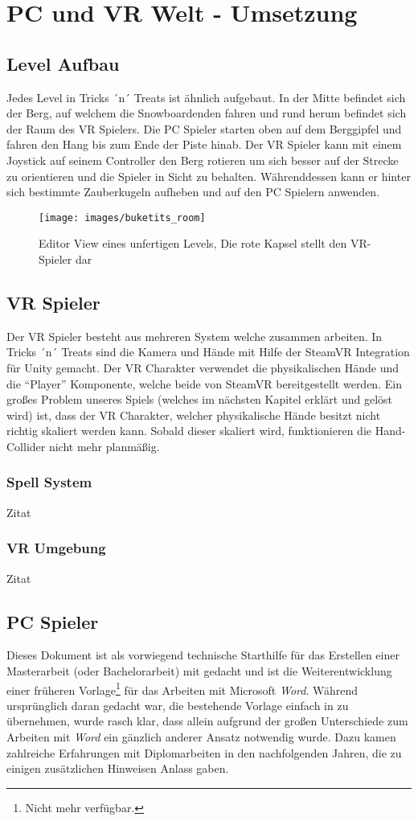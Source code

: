 \chapter{PC und VR Welt - Umsetzung}
\section{Level Aufbau}
Jedes Level in Tricks ´n´ Treats ist ähnlich aufgebaut. 
In der Mitte befindet sich der Berg, auf welchem die Snowboardenden fahren und rund herum befindet sich der Raum des VR Spielers. Die PC Spieler starten oben auf dem Berggipfel und fahren den Hang bis zum Ende der Piste hinab. Der VR Spieler kann mit einem Joystick auf seinem Controller den Berg rotieren um sich besser auf der Strecke zu orientieren und die Spieler in Sicht zu behalten. Währenddessen kann er hinter sich bestimmte Zauberkugeln aufheben und auf den PC Spielern anwenden.

\begin{figure}[h]
	\centering
	\texttt{[image: images/buketits\_room]}
	\caption{Editor View eines unfertigen Levels, Die rote Kapsel stellt den VR-Spieler dar}
\end{figure}

\section{VR Spieler}
Der VR Spieler besteht aus mehreren System welche zusammen arbeiten. In Tricks ´n´ Treats sind die Kamera und Hände mit Hilfe der SteamVR Integration für Unity gemacht. Der VR Charakter verwendet die physikalischen Hände und die "`Player"' Komponente, welche beide von SteamVR bereitgestellt werden. Ein großes Problem unseres Spiels (welches im nächsten Kapitel erklärt und gelöst wird) ist, dass der VR Charakter, welcher physikalische Hände besitzt nicht richtig skaliert werden kann. Sobald dieser skaliert wird, funktionieren die Hand-Collider nicht mehr planmäßig.

\subsection{Spell System}
Zitat

\subsection{VR Umgebung}
Zitat


\section{PC Spieler}
Dieses Dokument ist als vorwiegend technische Starthilfe für das
Erstellen einer Masterarbeit (oder Bachelorarbeit) mit \latex
gedacht und ist die Weiterentwicklung einer früheren
Vorlage\footnote{Nicht mehr verfügbar.} für das Arbeiten mit
Microsoft \emph{Word}. Während ursprünglich daran gedacht war, die
bestehende Vorlage einfach in \latex zu übernehmen, wurde rasch
klar, dass allein aufgrund der großen Unterschiede zum Arbeiten
mit \emph{Word} ein gänzlich anderer Ansatz notwendig wurde. Dazu
kamen zahlreiche Erfahrungen mit Diplomarbeiten in den
nachfolgenden Jahren, die zu einigen zusätzlichen Hinweisen Anlass gaben.

